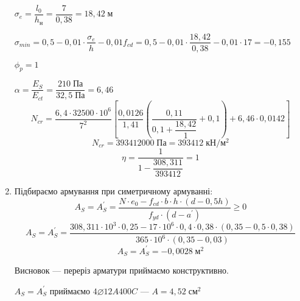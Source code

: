 \documentclass[a4paper,14pt]{article}
\begin{document}
\begin{enumerate}
    $\sigma_e = \dfrac{l_0}{h_\textit{н}} = \dfrac{7}{0,38} = 18,42\;\textit{м}$

    $\sigma_{min} = 0,5 - 0,01 \cdot \dfrac{\sigma_e}{h} - 0,01f_{cd} =  0,5 - 0,01 \cdot \dfrac{18,42}{0,38} - 0,01 \cdot 17 = -0,155$

    $\phi_p = 1$

    $\alpha = \dfrac{E_S}{E_{ct}} = \dfrac{210\;\textit{Па}}{32,5\;\textit{Па}} = 6,46$
    $$N_{cr} = \dfrac{6,4 \cdot 32500 \cdot 10^6}{7^2}\left[\dfrac{0,0126}{1,41}\left(\dfrac{0,11}{0,1 + \dfrac{18,42}{1}} + 0,1\right) + 6,46 \cdot 0,0142\right]$$
    $$N_{cr} = 393412000\;\textit{Па} = 393412\;\textit{кН}/\textit{м}^2$$
    $$\eta = \dfrac{1}{1 - \dfrac{308,311}{393412}} = 1$$
  
\item Підбираємо армування при симетричному армуванні:
    \begin{equation}
        A_S = A_S^\prime = \dfrac{N \cdot e_0 - f_{cd} \cdot b \cdot h \cdot (d - 0,5h)}{f_{yd} \cdot (d - a^\prime)} \geqslant 0
    \end{equation}
    $$A_S = A_S^\prime = \dfrac{308,311 \cdot 10^3 \cdot 0,25 - 17 \cdot 10^6 \cdot 0,4 \cdot 0,38 \cdot (0,35 - 0,5 \cdot 0,38)}{365 \cdot 10^6 \cdot (0,35 - 0,03)}$$
    $$A_S = A_S^\prime = -0,0028\;\textit{м}^2$$

    Висновок --- переріз арматури приймаємо конструктивно.

    $A_S = A_S^\prime$ приймаємо $4\varnothing12A400C$ --- $A = 4,52\;\textit{см}^2$
\end{enumerate}
\end{document}
